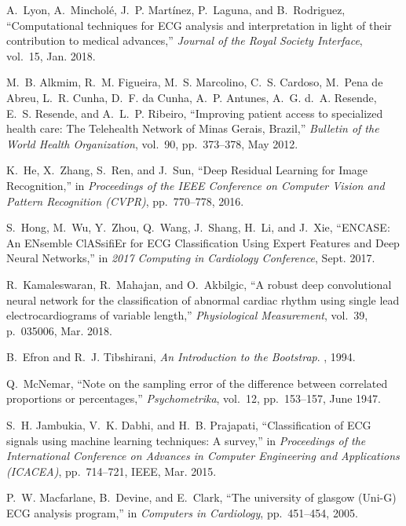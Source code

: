 \documentclass{article}
\begin{document}
\begin{thebibliography}{10}
A.~Lyon, A.~Minchol\'e, J.~P. Mart\'inez, P.~Laguna, and B.~Rodriguez,
  ``Computational techniques for {{ECG}} analysis and interpretation in light
  of their contribution to medical advances,'' {\em Journal of the Royal
  Society Interface}, vol.~15, Jan. 2018.

M.~B. Alkmim, R.~M. Figueira, M.~S. Marcolino, C.~S. Cardoso, M.~{Pena de
  Abreu}, L.~R. Cunha, D.~F. {da Cunha}, A.~P. Antunes, A.~G. d.~A. Resende,
  E.~S. Resende, and A.~L.~P. Ribeiro, ``Improving patient access to
  specialized health care: The {{Telehealth Network}} of {{Minas Gerais}},
  {{Brazil}},'' {\em Bulletin of the World Health Organization}, vol.~90,
  pp.~373--378, May 2012.

K.~He, X.~Zhang, S.~Ren, and J.~Sun, ``Deep {{Residual Learning}} for {{Image
  Recognition}},'' in {\em Proceedings of the {{IEEE Conference}} on {{Computer
  Vision}} and {{Pattern Recognition}} ({{CVPR}})}, pp.~770--778, 2016.

S.~Hong, M.~Wu, Y.~Zhou, Q.~Wang, J.~Shang, H.~Li, and J.~Xie, ``{{ENCASE}}: An
  {{ENsemble ClASsifiEr}} for {{ECG Classification Using Expert Features}} and
  {{Deep Neural Networks}},'' in {\em 2017 {{Computing}} in {{Cardiology
  Conference}}}, Sept. 2017.

R.~Kamaleswaran, R.~Mahajan, and O.~Akbilgic, ``A robust deep convolutional
  neural network for the classification of abnormal cardiac rhythm using single
  lead electrocardiograms of variable length,'' {\em Physiological
  Measurement}, vol.~39, p.~035006, Mar. 2018.

B.~Efron and R.~J. Tibshirani, {\em An Introduction to the Bootstrap}.
, 1994.

Q.~McNemar, ``Note on the sampling error of the difference between correlated
  proportions or percentages,'' {\em Psychometrika}, vol.~12, pp.~153--157,
  June 1947.

S.~H. Jambukia, V.~K. Dabhi, and H.~B. Prajapati, ``Classification of {{ECG}}
  signals using machine learning techniques: {{A}} survey,'' in {\em
  Proceedings of the {{International Conference}} on {{Advances}} in {{Computer
  Engineering}} and {{Applications}} ({{ICACEA}})}, pp.~714--721, {IEEE}, Mar.
  2015.

P.~W. Macfarlane, B.~Devine, and E.~Clark, ``The university of glasgow
  ({{Uni}}-{{G}}) {{ECG}} analysis program,'' in {\em Computers in
  {{Cardiology}}}, pp.~451--454, 2005.


\end{thebibliography}
\end{document}
